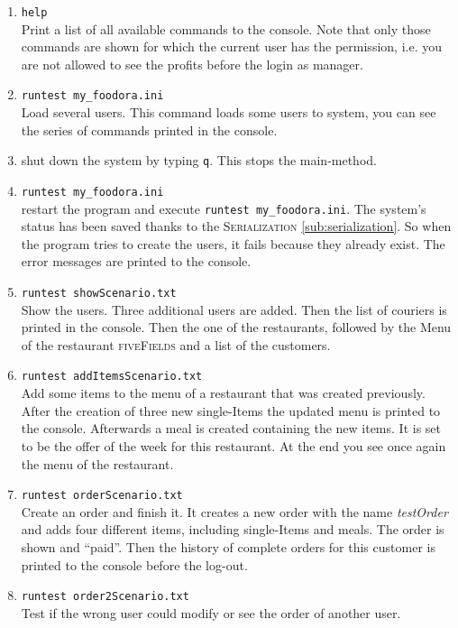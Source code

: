 \begin{enumerate}[itemsep=0mm]
	\item \lstinline|help| \\
		Print a list of all available commands to the console.
		Note that only those commands are shown for which the current user has the 
		permission, i.e. you are not allowed to see the profits before the login as 
		manager.
	\item \lstinline|runtest my_foodora.ini| \\
		Load several users. This command loads 
		some users to system, you can see the series of commands printed in the console.
	\item shut down the system by typing \lstinline|q|. This stops the main-method.
	\item \lstinline|runtest my_foodora.ini| \\
		restart the program and execute \lstinline|runtest my_foodora.ini|. The system's 
		status has been saved thanks to the \textsc{Serialization} \ref{sub:serialization}.
		So when the program tries
		to create the users, it fails because they already exist. The error messages are 
		printed to the console.
	\item \lstinline|runtest showScenario.txt| \\
		Show the users. Three additional users
		are added. Then the list of couriers is printed in the console. Then the one of the 
		restaurants, followed by the Menu of the restaurant \textsc{fiveFields} and a list of
		the customers.
	\item \lstinline|runtest addItemsScenario.txt| \\
		Add some items to the menu of a restaurant that was created previously. After the creation of three new 
		single-Items the updated menu is printed to the console. Afterwards a meal is created
		containing the new items. It is set to be the offer of the week for this restaurant.
		At the end you see once again the menu of the restaurant.
	\item \lstinline|runtest orderScenario.txt| \\
		Create an order and finish it. It 
		creates a new order with the name \textit{testOrder} and adds four different items, 
		including single-Items and meals. The order is shown and ``paid''. Then the history
		of complete orders for this customer is printed to the console before the log-out.
	\item \lstinline|runtest order2Scenario.txt| \\
		Test if the wrong user could modify or see the order of another user.

\end{enumerate}
